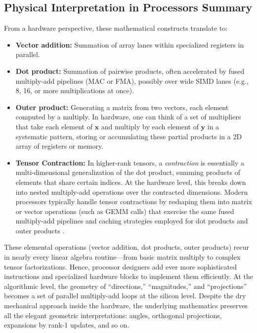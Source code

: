 \subsection{Physical Interpretation in Processors Summary}
From a hardware perspective, these mathematical constructs translate to:
\begin{itemize}
  \item \textbf{Vector addition:} Summation of array lanes within specialized registers in parallel.
  \item \textbf{Dot product:} Summation of pairwise products, often accelerated by fused multiply-add pipelines (MAC or FMA), possibly over wide SIMD lanes (e.g., 8, 16, or more multiplications at once).
  \item \textbf{Outer product:} Generating a matrix from two vectors, each element computed by a multiply. In hardware, one can think of a set of multipliers that take each element of $\mathbf{x}$ and multiply by each element of $\mathbf{y}$ in a systematic pattern, storing or accumulating these partial products in a 2D array of registers or memory.
  \item \textbf{Tensor Contraction:} In higher-rank tensors, a \emph{contraction} is essentially a 
multi-dimensional generalization of the dot product, summing products of elements that share certain 
indices. At the hardware level, this breaks down into nested multiply-add operations over the 
contracted dimensions. Modern processors typically handle tensor contractions by reshaping them into 
matrix or vector operations (such as GEMM calls) that exercise the same fused multiply-add pipelines 
and caching strategies employed for dot products and outer products \cite{jia2014caffe, krizhevsky2012imagenet}.

\end{itemize}

These elemental operations (vector addition, dot products, outer products) recur in nearly every linear algebra routine---from basic matrix multiply to complex tensor factorizations. Hence, processor designers add ever more sophisticated instructions and specialized hardware blocks to implement them efficiently. At the algorithmic level, the geometry of “directions,” “magnitudes,” and “projections” becomes a set of parallel multiply-add loops at the silicon level. Despite the dry mechanical approach inside the hardware, the underlying mathematics preserves all the elegant geometric interpretations: angles, orthogonal projections, expansions by rank-1 updates, and so on.


